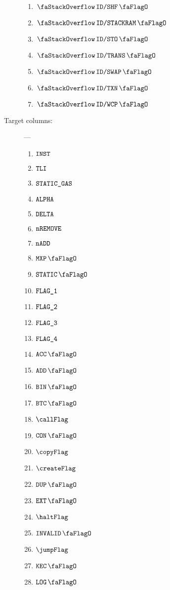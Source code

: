 \begin{description}
\begin{multicols}{3}
\begin{enumerate}
				\item $\stackDecShfFlag$
				\item $\stackDecStackRamFlag$
				\item $\stackDecStoFlag$
				\item $\stackDecTransFlag$
				\item $\stackDecSwapFlag$
				\item $\stackDecTxnFlag$
				\item $\stackDecWcpFlag$
			\end{enumerate}
		\end{multicols}
	\item[Target columns:] ---
		\begin{multicols}{3}
			\begin{enumerate}
				\item $\texttt{INST}$
				\item $\texttt{TLI}$
				\item $\texttt{STATIC\_GAS}$
				\item $\texttt{ALPHA}$
				\item $\texttt{DELTA}$
				\item $\texttt{nREMOVE}$
				\item $\texttt{nADD}$
				\item $\mxpFlag$
				\item $\staticFlag$
				\item $\texttt{FLAG\_1}$
				\item $\texttt{FLAG\_2}$
				\item $\texttt{FLAG\_3}$
				\item $\texttt{FLAG\_4}$
				\item $\accFlag$
				\item $\addFlag$
				\item $\binFlag$
				\item $\btcFlag$
				\item $\callFlag$
				\item $\conFlag$
				\item $\copyFlag$
				\item $\createFlag$
				\item $\dupFlag$
				\item $\extFlag$
				\item $\haltFlag$
				\item $\invalidFlag$
				\item $\jumpFlag$
				\item $\kecFlag$
				\item $\logFlag$

\end{enumerate}
\end{multicols}
\end{description}
